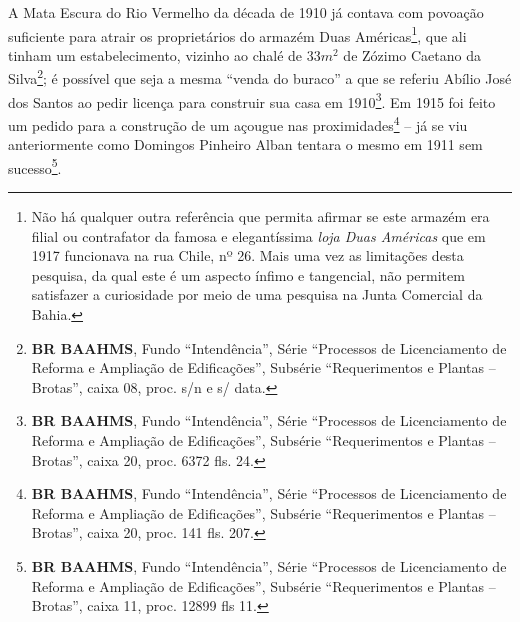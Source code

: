 A Mata Escura do Rio Vermelho da década de 1910 já contava com povoação suficiente para atrair os proprietários do armazém Duas Américas\footnote{Não há qualquer outra referência que permita afirmar se este armazém era filial ou contrafator da famosa e elegantíssima \textit{loja Duas Américas} que em 1917 funcionava na rua Chile, nº 26. Mais uma vez as limitações desta pesquisa, da qual este é um aspecto ínfimo e tangencial, não permitem satisfazer a curiosidade por meio de uma pesquisa na Junta Comercial da Bahia.}, que ali tinham um estabelecimento, vizinho ao chalé de 33$m^{2}$ de Zózimo Caetano da Silva\footnote{\textbf{BR BAAHMS}, Fundo ``Intendência'', Série ``Processos de Licenciamento de Reforma e Ampliação de Edificações'', Subsérie ``Requerimentos e Plantas -- Brotas'', caixa 08, proc. s/n e s/ data.}; é possível que seja a mesma ``venda do buraco'' a que se referiu Abílio José dos Santos ao pedir licença para construir sua casa em 1910\footnote{\textbf{BR BAAHMS}, Fundo ``Intendência'', Série ``Processos de Licenciamento de Reforma e Ampliação de Edificações'', Subsérie ``Requerimentos e Plantas -- Brotas'', caixa 20, proc. 6372 fls. 24.}. Em 1915 foi feito um pedido para a construção de um açougue nas proximidades\footnote{\textbf{BR BAAHMS}, Fundo ``Intendência'', Série ``Processos de Licenciamento de Reforma e Ampliação de Edificações'', Subsérie ``Requerimentos e Plantas -- Brotas'', caixa 20, proc. 141 fls. 207.} -- já se viu anteriormente como Domingos Pinheiro Alban tentara o mesmo em 1911 sem sucesso\footnote{\textbf{BR BAAHMS}, Fundo ``Intendência'', Série ``Processos de Licenciamento de Reforma e Ampliação de Edificações'', Subsérie ``Requerimentos e Plantas – Brotas'', caixa 11, proc. 12899 fls 11.}.





